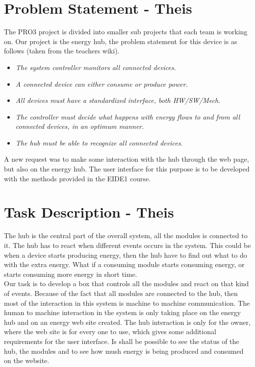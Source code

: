 \section{Problem Statement - Theis}
The PRO3 project is divided into smaller sub projects that each team is working on. Our project is the energy hub, the problem statement for this device is as follows (taken from the teachers wiki).
\begin{itemize}
	\item\textit{The system controller monitors all connected devices.}
	\item\textit{A connected device can either consume or produce power.}
	\item\textit{All devices must have a standardized interface, both HW/SW/Mech.}
	\item\textit{The controller must decide what happens with energy flows to and from all connected devices, in an optimum manner.}
	\item\textit{The hub must be able to recognize all connected devices.}
\end{itemize}
A new request was to make some interaction with the hub through the web page, but also on the energy hub. The user interface for this purpose is to be developed with the methods provided in the EIDE1 course.


\section{Task Description - Theis}
The hub is the central part of the overall system, all the modules is connected to it. The hub has to react when different events occurs in the system. This could be when a device starts producing energy, then the hub have to find out what to do with the extra energy. What if a consuming module starts consuming energy, or starts consuming more energy in short time. 
\\[0.2cm]
Our task is to develop a box that controls all the modules and react on that kind of events. Because of the fact that all modules are connected to the hub, then most of the interaction in this system is machine to machine communication. The human to machine interaction in the system is only taking place on the energy hub and on an energy web site created. The hub interaction is only for the owner, where the web site is for every one to use, which gives some additional requirements for the user interface. Is shall be possible to see the status of the hub, the modules and to see how mush energy is being produced and consumed on the website.

